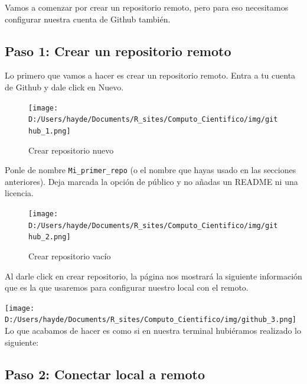 \documentclass[
]{book}
\newenvironment{Shaded}{\begin{snugshade}}{\end{snugshade}}
\newcommand{\ExtensionTok}[1]{#1}
\newcommand{\NormalTok}[1]{#1}
\begin{document}
Vamos a comenzar por crear un repositorio remoto, pero para eso necesitamos configurar nuestra cuenta de Github también.

\hypertarget{paso-1-crear-un-repositorio-remoto}{%
\subsection{Paso 1: Crear un repositorio remoto}\label{paso-1-crear-un-repositorio-remoto}}

Lo primero que vamos a hacer es crear un repositorio remoto. Entra a tu cuenta de Github y dale click en Nuevo.

\begin{figure}
\centering
\texttt{[image: D:/Users/hayde/Documents/R\_sites/Computo\_Cientifico/img/github\_1.png]}
\caption{Crear repositorio nuevo}
\end{figure}

Ponle de nombre \texttt{Mi\_primer\_repo} (o el nombre que hayas usado en las secciones anteriores). Deja marcada la opción de público y no añadas un README ni una licencia.

\begin{figure}
\centering
\texttt{[image: D:/Users/hayde/Documents/R\_sites/Computo\_Cientifico/img/github\_2.png]}
\caption{Crear repositorio vacío}
\end{figure}

Al darle click en crear repositorio, la página nos mostrará la siguiente información que es la que usaremos para configurar nuestro local con el remoto.

\texttt{[image: D:/Users/hayde/Documents/R\_sites/Computo\_Cientifico/img/github\_3.png]}
Lo que acabamos de hacer es como si en nuestra terminal hubiéramos realizado lo siguiente:

\begin{Shaded}
\end{Shaded}

\hypertarget{paso-2-conectar-local-a-remoto}{%
\subsection{Paso 2: Conectar local a remoto}\label{paso-2-conectar-local-a-remoto}}
\end{document}
